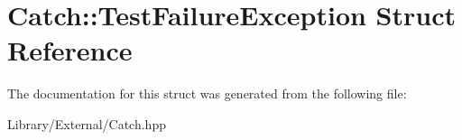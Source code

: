 \hypertarget{struct_catch_1_1_test_failure_exception}{}\section{Catch\+:\+:Test\+Failure\+Exception Struct Reference}
\label{struct_catch_1_1_test_failure_exception}


The documentation for this struct was generated from the following file\+:\begin{DoxyCompactItemize}
\item 
Library/\+External/Catch.\+hpp\end{DoxyCompactItemize}
